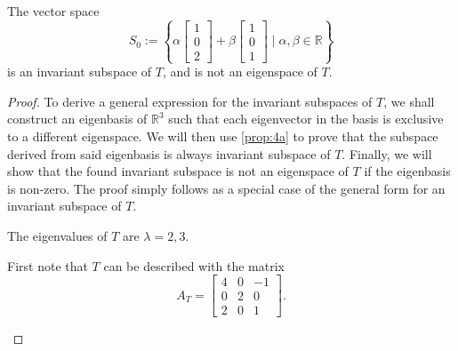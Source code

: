 \begin{enumerate}
\begin{enumerate}
                \begin{proposition} \label{prop:4b}
                    The vector space
                    \[
                        S_0 := \left\{\alpha
                            \begin{bmatrix}
                                1 \\ 0 \\ 2
                            \end{bmatrix} + \beta
                            \begin{bmatrix}
                                1 \\ 0 \\ 1
                            \end{bmatrix}
                            \; \Big| \; \alpha, \beta \in \mathbb{R}
                        \right\}
                    \]
                    is an invariant subspace of $T$, and is not an eigenspace of $T$.
                \end{proposition}

                \smallskip

                \begin{proof}
                    To derive a general expression for the invariant subspaces of $T$, we shall construct an eigenbasis of $\mathbb{R}^3$ such that each eigenvector in the basis is exclusive to a different eigenspace.
                    We will then use \cref{prop:4a} to prove that the subspace derived from said eigenbasis is always invariant subspace of $T$.
                    Finally, we will show that the found invariant subspace is not an eigenspace of $T$ if the eigenbasis is non-zero.
                    The proof simply follows as a special case of the general form for an invariant subspace of $T$.

                    \smallskip

                    \begin{claim} \label{claim:4b-1}
                        The eigenvalues of $T$ are $\lambda = 2, 3$.
                    \end{claim}

                    \begin{subproof}
                        First note that $T$ can be described with the matrix
                        \[
                            A_T =
                            \begin{bmatrix}
                                4 & 0 & -1 \\
                                0 & 2 & 0 \\
                                2 & 0 & 1
                            \end{bmatrix}.
                        \]


\end{subproof}
\end{proof}
\end{enumerate}
\end{enumerate}
